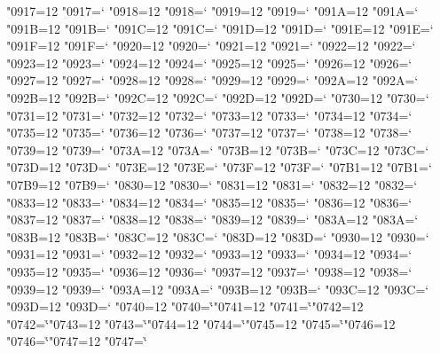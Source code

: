 \catcode"0917=12 \lccode"0917=`\a
\catcode"0918=12 \lccode"0918=`\a
\catcode"0919=12 \lccode"0919=`\a
\catcode"091A=12 \lccode"091A=`\a
\catcode"091B=12 \lccode"091B=`\a
\catcode"091C=12 \lccode"091C=`\a
\catcode"091D=12 \lccode"091D=`\a
\catcode"091E=12 \lccode"091E=`\a
\catcode"091F=12 \lccode"091F=`\a
\catcode"0920=12 \lccode"0920=`\a
\catcode"0921=12 \lccode"0921=`\a
\catcode"0922=12 \lccode"0922=`\a
\catcode"0923=12 \lccode"0923=`\a
\catcode"0924=12 \lccode"0924=`\a
\catcode"0925=12 \lccode"0925=`\a
\catcode"0926=12 \lccode"0926=`\a
\catcode"0927=12 \lccode"0927=`\a
\catcode"0928=12 \lccode"0928=`\a
\catcode"0929=12 \lccode"0929=`\a
\catcode"092A=12 \lccode"092A=`\a
\catcode"092B=12 \lccode"092B=`\a
\catcode"092C=12 \lccode"092C=`\a
\catcode"092D=12 \lccode"092D=`\a
\catcode"0730=12 \lccode"0730=`\e
\catcode"0731=12 \lccode"0731=`\e
\catcode"0732=12 \lccode"0732=`\e
\catcode"0733=12 \lccode"0733=`\e
\catcode"0734=12 \lccode"0734=`\e
\catcode"0735=12 \lccode"0735=`\e
\catcode"0736=12 \lccode"0736=`\e
\catcode"0737=12 \lccode"0737=`\e
\catcode"0738=12 \lccode"0738=`\e
\catcode"0739=12 \lccode"0739=`\e
\catcode"073A=12 \lccode"073A=`\e
\catcode"073B=12 \lccode"073B=`\e
\catcode"073C=12 \lccode"073C=`\e
\catcode"073D=12 \lccode"073D=`\e
\catcode"073E=12 \lccode"073E=`\e
\catcode"073F=12 \lccode"073F=`\e
\catcode"07B1=12 \lccode"07B1=`\e
\catcode"07B9=12 \lccode"07B9=`\e
\catcode"0830=12 \lccode"0830=`\e
\catcode"0831=12 \lccode"0831=`\e
\catcode"0832=12 \lccode"0832=`\e
\catcode"0833=12 \lccode"0833=`\e
\catcode"0834=12 \lccode"0834=`\e
\catcode"0835=12 \lccode"0835=`\e
\catcode"0836=12 \lccode"0836=`\e
\catcode"0837=12 \lccode"0837=`\e
\catcode"0838=12 \lccode"0838=`\e
\catcode"0839=12 \lccode"0839=`\e
\catcode"083A=12 \lccode"083A=`\e
\catcode"083B=12 \lccode"083B=`\e
\catcode"083C=12 \lccode"083C=`\e
\catcode"083D=12 \lccode"083D=`\e
\catcode"0930=12 \lccode"0930=`\e
\catcode"0931=12 \lccode"0931=`\e
\catcode"0932=12 \lccode"0932=`\e
\catcode"0933=12 \lccode"0933=`\e
\catcode"0934=12 \lccode"0934=`\e
\catcode"0935=12 \lccode"0935=`\e
\catcode"0936=12 \lccode"0936=`\e
\catcode"0937=12 \lccode"0937=`\e
\catcode"0938=12 \lccode"0938=`\e
\catcode"0939=12 \lccode"0939=`\e
\catcode"093A=12 \lccode"093A=`\e
\catcode"093B=12 \lccode"093B=`\e
\catcode"093C=12 \lccode"093C=`\e
\catcode"093D=12 \lccode"093D=`\e
\catcode"0740=12 \lccode"0740=`\h
\catcode"0741=12 \lccode"0741=`\h
\catcode"0742=12 \lccode"0742=`\h
\catcode"0743=12 \lccode"0743=`\h
\catcode"0744=12 \lccode"0744=`\h
\catcode"0745=12 \lccode"0745=`\h
\catcode"0746=12 \lccode"0746=`\h
\catcode"0747=12 \lccode"0747=`\h
